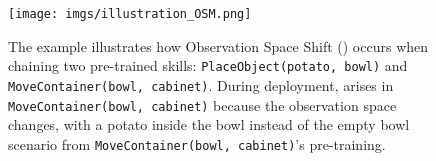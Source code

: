 \begin{figure}[t]
    \centering
    \texttt{[image: imgs/illustration\_OSM.png]} 
    \caption{The example illustrates how Observation Space Shift (\pb) occurs when chaining two pre-trained skills: \texttt{PlaceObject(potato, bowl)} and \texttt{MoveContainer(bowl, cabinet)}. During deployment, \pb arises in \texttt{MoveContainer(bowl, cabinet)} because the observation space changes, with a potato inside the bowl instead of the empty bowl scenario from \texttt{MoveContainer(bowl, cabinet)}'s pre-training. 
    }
    \vspace{-2em}
    \label{fig:osm_illustration}
\end{figure}



